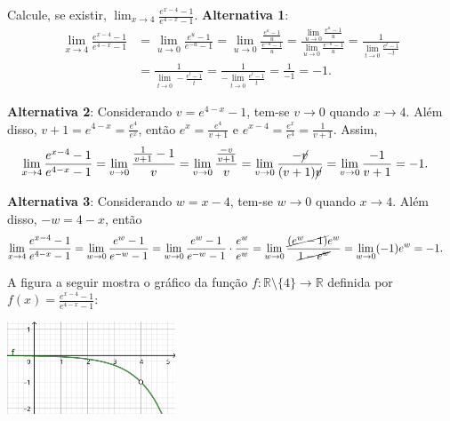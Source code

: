 \documentclass[12pt,a4paper]{article}
\begin{document}
\begin{ExerciseList}
\Exercise[title={2,0}] Calcule, se existir, $\displaystyle \lim_{x \to 4} \frac{e^{x-4}-1}{e^{4-x}-1}$.
\Answer \textbf{Alternativa 1}:
\begin{align*}
      \lim_{x \to 4} \frac{e^{x-4}-1}{e^{4-x}-1}
  & = \lim_{u \to 0} \frac{e^{u}-1}{e^{-u}-1}
    = \lim_{u \to 0} \frac{\frac{e^{u}-1}{u}}{\frac{e^{-u}-1}{u}}
    = \frac{\lim_{u \to 0} \frac{e^{u}-1}{u}}{\lim_{u \to 0} \frac{e^{-u}-1}{u}}
    = \frac{1}{\lim_{t \to 0}  \frac{e^{t}-1}{-t}} \\
  & = \frac{1}{\lim_{t \to 0} -\frac{e^{t}-1}{t}}
    = \frac{1}{-\lim_{t \to 0} \frac{e^{t}-1}{t}}
    = \frac{1}{-1}
    = -1.
\end{align*}

\textbf{Alternativa 2}: Considerando $v = e^{4-x} - 1$, tem-se $v\to 0$ quando $x\to 4$. Além disso, $v + 1 = e^{4-x} = \frac{e^4}{e^x}$, então $e^x = \frac{e^4}{v + 1}$ e $e^{x-4} = \frac{e^x}{e^4} = \frac{1}{v + 1}$. Assim,
\begin{align*}
      \lim_{x \to 4} \frac{e^{x-4}-1}{e^{4-x}-1}
  & = \lim_{v \to 0} \frac{\frac{1}{v+1}-1}{v}
    = \lim_{v \to 0} \frac{\frac{-v}{v+1}}{v}
    = \lim_{v \to 0} \frac{-\cancel{v}}{(v+1)\cancel{v}}
    = \lim_{v \to 0} \frac{-1}{v+1}
    = -1.
\end{align*}

\textbf{Alternativa 3}: Considerando $w = x-4$, tem-se $w\to 0$ quando $x\to 4$. Além disso, $-w = 4-x$, então
\begin{align*}
      \lim_{x \to 4} \frac{e^{x - 4}-1}{e^{4 - x}-1}
  & = \lim_{w \to 0} \frac{e^{w} - 1}{e^{-w} - 1}
    = \lim_{w \to 0} \frac{e^{w} - 1}{e^{-w} - 1}\cdot \frac{e^{w}}{e^{w}}
    = \lim_{w \to 0} \frac{\cancel{(e^{w} - 1)}e^w}{\cancel{1 - e^w}}
    = \lim_{w \to 0} (-1)e^w
    = -1.
\end{align*}

A figura a seguir mostra o gráfico da função $f:\mathbb{R}\setminus\{4\}\to\mathbb{R}$ definida por $f(x) = \frac{e^{x-4}-1}{e^{4-x}-1}$:

\begin{center}
\includegraphics[width=5cm]{img/prova-2-nex-limite.pdf}
\end{center}



\end{ExerciseList}
\end{document}
